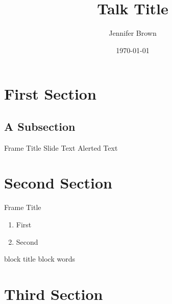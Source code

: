 \documentclass{beamer}
\title{Talk Title}
\author{Jennifer Brown}
\date{\today}
\begin{document}
	
\begin{frame}
	\titlepage
\end{frame}

\begin{frame}
	\tableofcontents
\end{frame}

\section{First Section}
\subsection{A Subsection}

\begin{frame}{Frame Title}
	Slide Text
	\alert{Alerted Text}
	\note{}
\end{frame}

\section{Second Section}

\begin{frame}{Frame Title}
	\begin{enumerate}
		\item First
		\item Second
	\end{enumerate}
	
	\begin{block}{block title}
		block words
	\end{block}
\end{frame}

\section{Third Section}

\begin{frame}
	
\end{frame}
\end{document}
